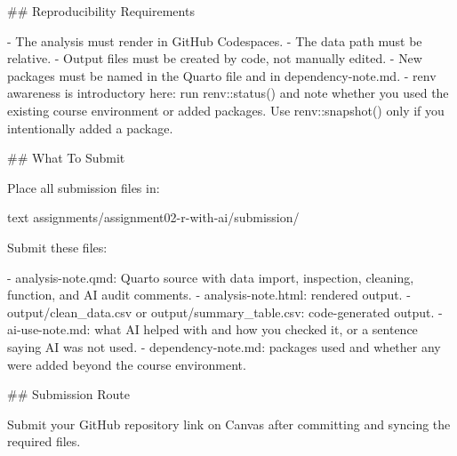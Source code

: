 \documentclass[
  letterpaper,
  DIV=11,
  numbers=noendperiod,
  oneside]{scrreprt}
\newenvironment{Shaded}{\begin{snugshade}}{\end{snugshade}}
\newcommand{\FunctionTok}[1]{\textcolor[rgb]{0.28,0.35,0.67}{#1}}
\newcommand{\InformationTok}[1]{\textcolor[rgb]{0.37,0.37,0.37}{#1}}
\newcommand{\NormalTok}[1]{\textcolor[rgb]{0.00,0.23,0.31}{#1}}
\newcommand{\SpecialStringTok}[1]{\textcolor[rgb]{0.13,0.47,0.30}{#1}}
\begin{document}
\begin{Shaded}
\begin{Highlighting}[numbers=left,,]
\FunctionTok{\#\# Reproducibility Requirements}

\SpecialStringTok{{-} }\NormalTok{The analysis must render in GitHub Codespaces.}
\SpecialStringTok{{-} }\NormalTok{The data path must be relative.}
\SpecialStringTok{{-} }\NormalTok{Output files must be created by code, not manually edited.}
\SpecialStringTok{{-} }\NormalTok{New packages must be named in the Quarto file and in }\InformationTok{\textasciigrave{}dependency{-}note.md\textasciigrave{}}\NormalTok{.}
\SpecialStringTok{{-} }\InformationTok{\textasciigrave{}renv\textasciigrave{}}\NormalTok{ awareness is introductory here: run }\InformationTok{\textasciigrave{}renv::status()\textasciigrave{}}\NormalTok{ and note whether you used the existing course environment or added packages. Use }\InformationTok{\textasciigrave{}renv::snapshot()\textasciigrave{}}\NormalTok{ only if you intentionally added a package.}

\FunctionTok{\#\# What To Submit}

\NormalTok{Place all submission files in:}

\InformationTok{\textasciigrave{}\textasciigrave{}\textasciigrave{}text}
\InformationTok{assignments/assignment02{-}r{-}with{-}ai/submission/}
\InformationTok{\textasciigrave{}\textasciigrave{}\textasciigrave{}}

\NormalTok{Submit these files:}

\SpecialStringTok{{-} }\InformationTok{\textasciigrave{}analysis{-}note.qmd\textasciigrave{}}\NormalTok{: Quarto source with data import, inspection, cleaning, function, and AI audit comments.}
\SpecialStringTok{{-} }\InformationTok{\textasciigrave{}analysis{-}note.html\textasciigrave{}}\NormalTok{: rendered output.}
\SpecialStringTok{{-} }\InformationTok{\textasciigrave{}output/clean\_data.csv\textasciigrave{}}\NormalTok{ or }\InformationTok{\textasciigrave{}output/summary\_table.csv\textasciigrave{}}\NormalTok{: code{-}generated output.}
\SpecialStringTok{{-} }\InformationTok{\textasciigrave{}ai{-}use{-}note.md\textasciigrave{}}\NormalTok{: what AI helped with and how you checked it, or a sentence saying AI was not used.}
\SpecialStringTok{{-} }\InformationTok{\textasciigrave{}dependency{-}note.md\textasciigrave{}}\NormalTok{: packages used and whether any were added beyond the course environment.}

\FunctionTok{\#\# Submission Route}

\NormalTok{Submit your GitHub repository link on Canvas after committing and syncing the required files.}


\end{Highlighting}
\end{Shaded}
\end{document}
